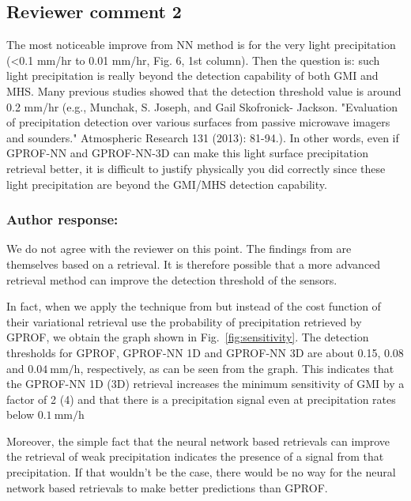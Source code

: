 \begin{itemize}
\end{itemize}





\subsection*{Reviewer comment 2}

The most noticeable improve from NN method is for the very light precipitation
(<0.1 mm/hr to 0.01 mm/hr, Fig. 6, 1st column). Then the question is: such light
precipitation is really beyond the detection capability of both GMI and MHS.
Many previous studies showed that the detection threshold value is around 0.2
mm/hr (e.g., Munchak, S. Joseph, and Gail Skofronick- Jackson. "Evaluation of
precipitation detection over various surfaces from passive microwave imagers and
sounders." Atmospheric Research 131 (2013): 81-94.). In other words, even if
GPROF-NN and GPROF-NN-3D can make this light surface precipitation retrieval
better, it is difficult to justify physically you did correctly since these
light precipitation are beyond the GMI/MHS detection capability.

\subsubsection{Author response:}

We do not agree with the reviewer on this point. The findings from
\citet{munchak13} are themselves based on a retrieval. It is therefore possible
that a more advanced retrieval method can improve the detection threshold of the
sensors.

In fact, when we apply the technique from \citet{munchak13} but instead of the
cost function of their variational retrieval use the probability of
precipitation retrieved by GPROF, we obtain the graph shown in
Fig.~\ref{fig:sensitivity}. The detection thresholds for GPROF, GPROF-NN 1D and
GPROF-NN 3D are about 0.15, 0.08 and $\SI{0.04}{\milli \meter \per \hour}$,
respectively, as can be seen from the graph. This indicates that the GPROF-NN 1D
(3D) retrieval increases the minimum sensitivity of GMI by a factor of 2 (4) and
that there is a precipitation signal even at precipitation rates below
$\SI{0.1}{\milli \meter \per \hour}$

Moreover, the simple fact that the neural network based retrievals can improve
the retrieval of weak precipitation indicates the presence of a signal from that
precipitation. If that wouldn't be the case, there would be no way for the
neural network based retrievals to make better predictions than GPROF.

